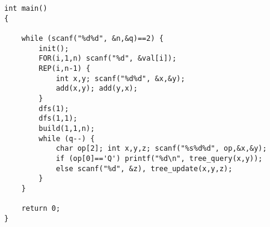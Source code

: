 \begin{lstlisting}
int main()
{

    while (scanf("%d%d", &n,&q)==2) {
        init();
        FOR(i,1,n) scanf("%d", &val[i]);
        REP(i,n-1) {
            int x,y; scanf("%d%d", &x,&y);
            add(x,y); add(y,x);
        }
        dfs(1);
        dfs(1,1);
        build(1,1,n);
        while (q--) {
            char op[2]; int x,y,z; scanf("%s%d%d", op,&x,&y);
            if (op[0]=='Q') printf("%d\n", tree_query(x,y));
            else scanf("%d", &z), tree_update(x,y,z);
        }
    }

    return 0;
}
\end{lstlisting}